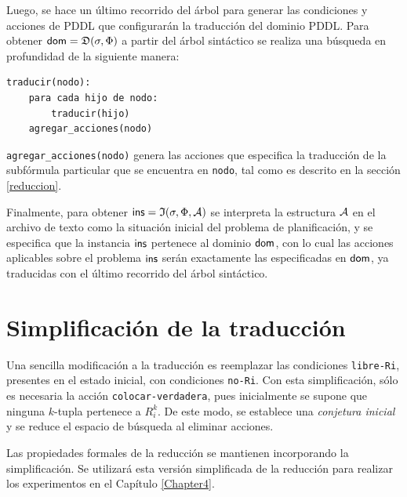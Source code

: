 Luego, se hace un último recorrido del árbol para generar las condiciones
y acciones de PDDL que configurarán la traducción del dominio PDDL.
Para obtener $\mathsf{dom}=\mathfrak{D}(\sigma,\Phi)$ a partir del árbol sintáctico se
realiza una búsqueda en profundidad de la siguiente manera:
\begin{center}
\begin{verbatim}
traducir(nodo):
    para cada hijo de nodo:
        traducir(hijo)
    agregar_acciones(nodo)
\end{verbatim}
\end{center}
\texttt{agregar\_acciones(nodo)} genera las acciones que especifica la traducción de la
subfórmula particular que se encuentra en \texttt{nodo}, tal como
es descrito en la sección \ref{reduccion}.

Finalmente, para obtener $\mathsf{ins}=\mathfrak{I}(\sigma,\Phi,\mathcal{A})$ se interpreta la
estructura $\mathcal{A}$ en el archivo de texto como la situación inicial del problema
de planificación, y se especifica que la instancia $\mathsf{ins}$ pertenece al
dominio $\mathsf{dom}$, con lo cual las acciones aplicables sobre el problema
$\mathsf{ins}$ serán exactamente las especificadas en $\mathsf{dom}$, ya traducidas con
el último recorrido del árbol sintáctico.

\section{Simplificación de la traducción}
\label{simplificacion}
Una sencilla modificación a la traducción es reemplazar las
condiciones \texttt{libre-Ri}, presentes en el estado inicial, con
condiciones \texttt{no-Ri}. Con esta simplificación, sólo es necesaria la
acción \texttt{colocar-verdadera}, pues inicialmente se supone que ninguna
$k$-tupla pertenece a $R_i^k$. De este modo, se establece una \textit{conjetura
inicial} y se reduce el espacio de búsqueda al eliminar acciones.

Las propiedades formales de la reducción se mantienen incorporando la
simplificación. Se utilizará esta versión simplificada de la
reducción para realizar los experimentos en el Capítulo \ref{Chapter4}.

%
%
%
